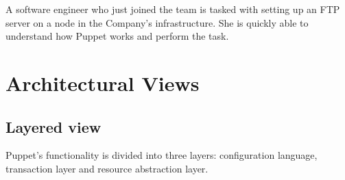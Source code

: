 \documentclass[a4paper]{article}
\begin{document}
A software engineer who just joined the team is tasked with setting up an FTP server on a node in the Company's infrastructure. She is quickly able to understand how Puppet works and perform the task.





\section{Architectural Views} %



\subsection{Layered view}

Puppet’s functionality is divided into three layers: configuration language, transaction layer and resource abstraction layer.
\end{document}
